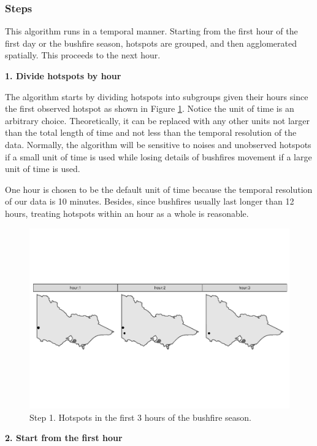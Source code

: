 \hypertarget{steps}{%
\subsubsection{Steps}\label{steps}}

This algorithm runs in a temporal manner. Starting from the first hour
of the first day or the bushfire season, hotspots are grouped, and then
agglomerated spatially. This proceeds to the next hour.

\textbf{1. Divide hotspots by hour}

The algorithm starts by dividing hotspots into subgroups given their
hours since the first observed hotspot as shown in Figure
\ref{fig:step1}. Notice the unit of time is an arbitrary choice.
Theoretically, it can be replaced with any other units not larger than
the total length of time and not less than the temporal resolution of
the data. Normally, the algorithm will be sensitive to noises and
unobserved hotspots if a small unit of time is used while losing details
of bushfires movement if a large unit of time is used.

One hour is chosen to be the default unit of time because the temporal
resolution of our data is 10 minutes. Besides, since bushfires usually
last longer than 12 hours, treating hotspots within an hour as a whole
is reasonable.

\begin{Schunk}
\begin{figure}
\includegraphics[width=0.8\linewidth]{clustering_paper_files/figure-latex/step1-1} \caption[Step 1]{Step 1. Hotspots in the first 3 hours of the bushfire season.}\label{fig:step1}
\end{figure}
\end{Schunk}

\textbf{2. Start from the first hour}

